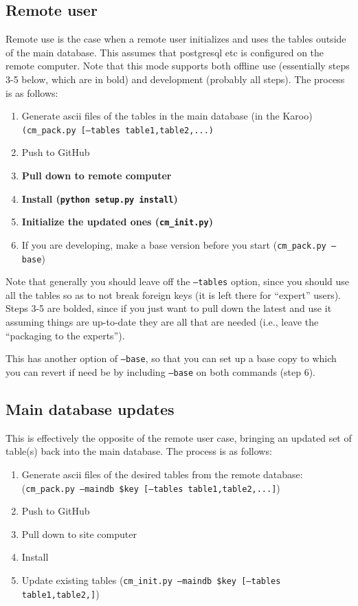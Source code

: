 \documentclass{article}
\begin{document}
\subsection{Remote user}
Remote use is the case when a remote user initializes and uses the tables outside of the main database.  This assumes that postgresql etc is configured on the remote computer.  Note that this mode supports both offline use (essentially steps 3-5 below, which are in bold) and development (probably all steps).  The process is as follows: 
\begin{enumerate}\setlength\itemsep{-.3em}
	\item Generate ascii files of the tables in the main database (in the Karoo) {\tt (cm\_pack.py [--tables table1,table2,...)}
	\item Push to GitHub
	\item {\bf Pull down to remote computer}
	\item {\bf Install ({\tt python setup.py install})}
	\item {\bf Initialize the updated ones ({\tt cm\_init.py})}
	\item If you are developing, make a base version before you start ({\tt cm\_pack.py --base})
\end{enumerate}

Note that generally you should leave off the {\tt --tables} option, since you should use all the tables so as to not break foreign keys (it is left there for ``expert'' users).  Steps 3-5 are bolded, since if you just want to pull down the latest and use it assuming things are up-to-date they are all that are needed (i.e., leave the ``packaging to the experts'').

This has another option of {\tt --base}, so that you can set up a base copy to which you can revert if need be by including {\tt --base} on both commands (step 6).
	
\subsection{Main database updates}
This is effectively the opposite of the remote user case, bringing an updated set of table(s) back into the main database.  The process is as follows:
\begin{enumerate}\setlength\itemsep{-.3em}
	\item  Generate ascii files of the desired tables from the remote database: 
		({\tt cm\_pack.py --maindb \$key [--tables table1,table2,...]})
	\item Push to GitHub
	\item Pull down to site computer
	\item Install
	\item Update existing tables  ({\tt cm\_init.py --maindb \$key [--tables table1,table2,]})
\end{enumerate}
\end{document}
